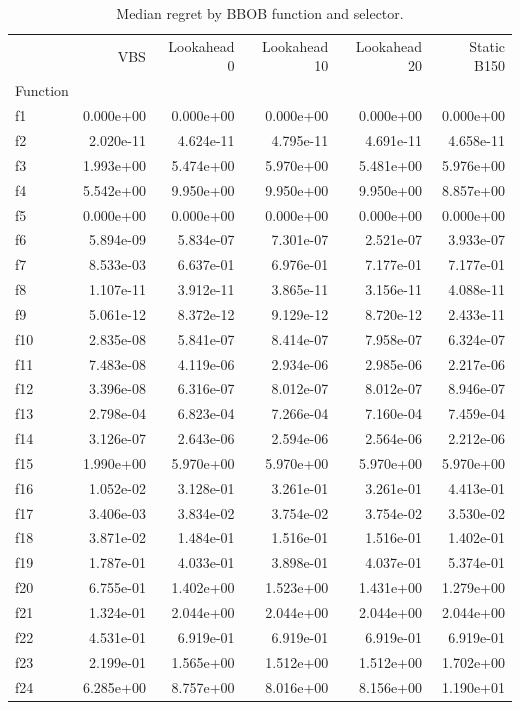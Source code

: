 \begin{table}
\caption{Median regret by BBOB function and selector.}
\label{tab:function-wise-median-regret}
\begin{tabular}{lrrrrr}
\toprule
 & VBS & Lookahead 0 & Lookahead 10 & Lookahead 20 & Static B150 \\
Function &  &  &  &  &  \\
\midrule
f1 & 0.000e+00 & 0.000e+00 & 0.000e+00 & 0.000e+00 & 0.000e+00 \\
f2 & 2.020e-11 & 4.624e-11 & 4.795e-11 & 4.691e-11 & 4.658e-11 \\
f3 & 1.993e+00 & 5.474e+00 & 5.970e+00 & 5.481e+00 & 5.976e+00 \\
f4 & 5.542e+00 & 9.950e+00 & 9.950e+00 & 9.950e+00 & 8.857e+00 \\
f5 & 0.000e+00 & 0.000e+00 & 0.000e+00 & 0.000e+00 & 0.000e+00 \\
f6 & 5.894e-09 & 5.834e-07 & 7.301e-07 & 2.521e-07 & 3.933e-07 \\
f7 & 8.533e-03 & 6.637e-01 & 6.976e-01 & 7.177e-01 & 7.177e-01 \\
f8 & 1.107e-11 & 3.912e-11 & 3.865e-11 & 3.156e-11 & 4.088e-11 \\
f9 & 5.061e-12 & 8.372e-12 & 9.129e-12 & 8.720e-12 & 2.433e-11 \\
f10 & 2.835e-08 & 5.841e-07 & 8.414e-07 & 7.958e-07 & 6.324e-07 \\
f11 & 7.483e-08 & 4.119e-06 & 2.934e-06 & 2.985e-06 & 2.217e-06 \\
f12 & 3.396e-08 & 6.316e-07 & 8.012e-07 & 8.012e-07 & 8.946e-07 \\
f13 & 2.798e-04 & 6.823e-04 & 7.266e-04 & 7.160e-04 & 7.459e-04 \\
f14 & 3.126e-07 & 2.643e-06 & 2.594e-06 & 2.564e-06 & 2.212e-06 \\
f15 & 1.990e+00 & 5.970e+00 & 5.970e+00 & 5.970e+00 & 5.970e+00 \\
f16 & 1.052e-02 & 3.128e-01 & 3.261e-01 & 3.261e-01 & 4.413e-01 \\
f17 & 3.406e-03 & 3.834e-02 & 3.754e-02 & 3.754e-02 & 3.530e-02 \\
f18 & 3.871e-02 & 1.484e-01 & 1.516e-01 & 1.516e-01 & 1.402e-01 \\
f19 & 1.787e-01 & 4.033e-01 & 3.898e-01 & 4.037e-01 & 5.374e-01 \\
f20 & 6.755e-01 & 1.402e+00 & 1.523e+00 & 1.431e+00 & 1.279e+00 \\
f21 & 1.324e-01 & 2.044e+00 & 2.044e+00 & 2.044e+00 & 2.044e+00 \\
f22 & 4.531e-01 & 6.919e-01 & 6.919e-01 & 6.919e-01 & 6.919e-01 \\
f23 & 2.199e-01 & 1.565e+00 & 1.512e+00 & 1.512e+00 & 1.702e+00 \\
f24 & 6.285e+00 & 8.757e+00 & 8.016e+00 & 8.156e+00 & 1.190e+01 \\
\bottomrule
\end{tabular}
\end{table}
